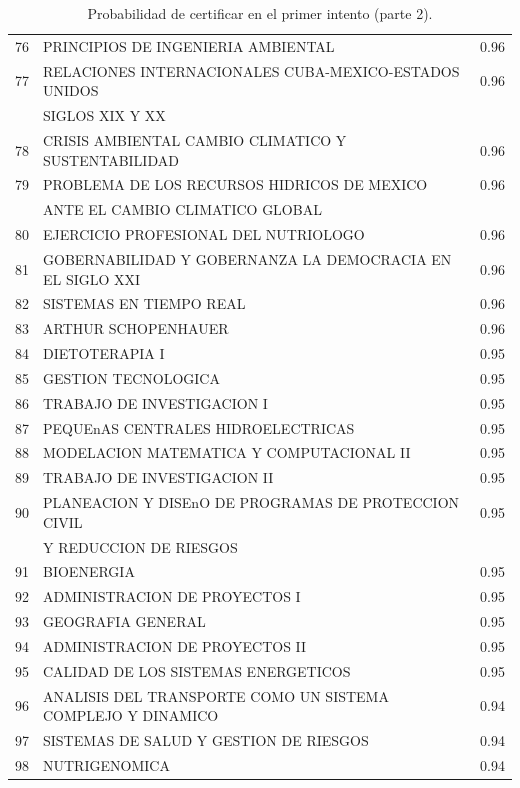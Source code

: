 \documentclass[12pt]{article}
\begin{document}
\begin{table}[ht]
{\begin{tabular}{rlr}
  76 & PRINCIPIOS DE INGENIERIA AMBIENTAL & 0.96 \\ 
  77 & RELACIONES INTERNACIONALES CUBA-MEXICO-ESTADOS UNIDOS  & 0.96 \\ 
     & SIGLOS XIX Y XX & \\ 
78 & CRISIS AMBIENTAL CAMBIO CLIMATICO Y SUSTENTABILIDAD & 0.96 \\ 
  79 & PROBLEMA DE LOS RECURSOS HIDRICOS DE MEXICO  & 0.96 \\ 
 & ANTE EL CAMBIO CLIMATICO GLOBAL & \\ 
 80 & EJERCICIO PROFESIONAL DEL NUTRIOLOGO & 0.96 \\ 
  81 & GOBERNABILIDAD Y GOBERNANZA LA DEMOCRACIA EN EL SIGLO XXI & 0.96 \\ 
  82 & SISTEMAS EN TIEMPO REAL & 0.96 \\ 
  83 & ARTHUR SCHOPENHAUER & 0.96 \\ 
  84 & DIETOTERAPIA I & 0.95 \\ 
  85 & GESTION TECNOLOGICA & 0.95 \\ 
  86 & TRABAJO DE INVESTIGACION I & 0.95 \\ 
  87 & PEQUEnAS CENTRALES HIDROELECTRICAS & 0.95 \\ 
  88 & MODELACION MATEMATICA Y COMPUTACIONAL II & 0.95 \\ 
  89 & TRABAJO DE INVESTIGACION II & 0.95 \\ 
  90 & PLANEACION Y DISEnO DE PROGRAMAS DE PROTECCION CIVIL& 0.95 \\ 
 & Y REDUCCION DE RIESGOS & \\ 
  91 & BIOENERGIA & 0.95 \\ 
  92 & ADMINISTRACION DE PROYECTOS I & 0.95 \\ 
  93 & GEOGRAFIA GENERAL & 0.95 \\ 
  94 & ADMINISTRACION DE PROYECTOS II & 0.95 \\ 
  95 & CALIDAD DE LOS SISTEMAS ENERGETICOS & 0.95 \\ 
  96 & ANALISIS DEL TRANSPORTE COMO UN SISTEMA COMPLEJO Y DINAMICO & 0.94 \\ 
  97 & SISTEMAS DE SALUD Y GESTION DE RIESGOS & 0.94 \\ 
  98 & NUTRIGENOMICA & 0.94 \\ 
     \hline
\end{tabular}
}
\caption{\label{Prob_Cert_Intento_2}Probabilidad de certificar en el primer intento (parte 2).}
\end{table}
\end{document}
